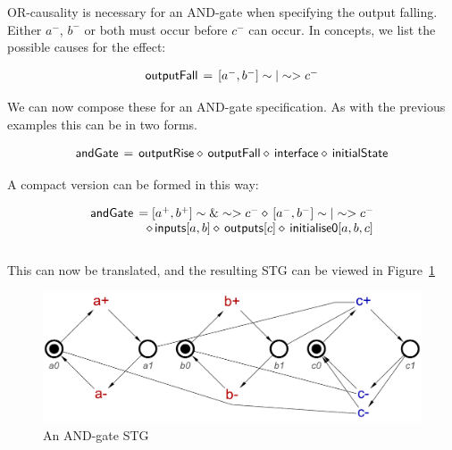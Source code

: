\documentclass[british, journal]{IEEEtran}
\begin{document}
\noindent OR-causality is necessary for an AND-gate when specifying the output falling. Either $a^{-}$,
$b^{-}$ or both must occur before $c^{-}$ can occur. In concepts, we list the possible
causes for the effect:

\vspace{-3mm}
\[
\begin{array}{lcl}
\mathsf{outputFall}&\hspace{-2mm}=&\hspace{-2mm}[a^{-}, b^{-}] \sim|\sim> c^{-} 
\end{array}
\]

\noindent We can now compose these for an AND-gate specification. As with the previous examples
this can be in two forms.

\vspace{-3mm}
\[
\begin{array}{lcl}
\mathsf{andGate}&\hspace{-2mm}=&\hspace{-2mm}\mathsf{outputRise} \diamond\, \mathsf{outputFall} \diamond\, \mathsf{interface} 
\diamond\, \mathsf{initialState}
\end{array}
\]

\noindent A compact version can be formed in this way:

\vspace{-2mm}
 \[
\begin{array}{lcl}
\mathsf{andGate}&\hspace{-2mm}=[a^{+}, b^{+}] \sim\&\sim> c^{-} \diamond\, [a^{-}, b^{-}] \sim|\sim> c^{-} \\
&\diamond\, \mathsf{inputs}[a, b] \diamond\, \mathsf{outputs}[c] \diamond\, \mathsf{initialise0} [a, b, c]
\end{array}
\]
\\
\noindent This can now be translated, and the resulting STG can be viewed in Figure~\ref{fig:and-gate-stg}

\vspace{-3mm}

\begin{figure}[h]
\begin{centering}
\includegraphics[scale=0.25]{Images/and-gate-stg}
\par\end{centering}
\vspace{-1mm}
\protect\caption{\label{fig:and-gate-stg} An AND-gate STG}
\vspace{-2mm}
\end{figure}
\end{document}
